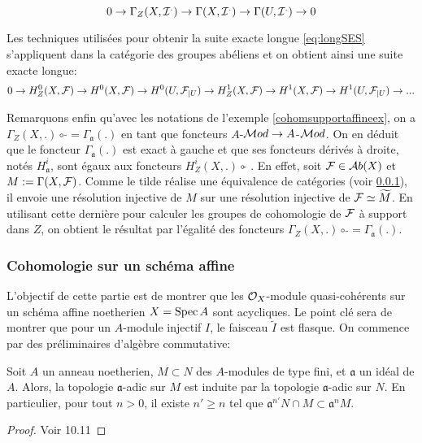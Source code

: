 $$0\rightarrow \Gamma_Z(X,\mathcal{I}^.)\rightarrow \Gamma(X,\mathcal{I}^.)\rightarrow \Gamma(U,\mathcal{I}^.)\rightarrow 0$$

Les techniques utilisées pour obtenir la suite exacte longue \ref{eq:longSES} s'appliquent dans la catégorie des groupes abéliens et on obtient ainsi une suite exacte longue:
\begin{equation}\label{eq:longSESSupport}
0\rightarrow H_Z^0(X,\mathcal{F})\rightarrow H^0(X,\mathcal{F})\rightarrow H^0(U,\mathcal{F}_{|U})\rightarrow  H_Z^1(X,\mathcal{F})\rightarrow H^1(X,\mathcal{F})\rightarrow H^1(U,\mathcal{F}_{|U})\rightarrow ...
\end{equation}


Remarquons enfin qu'avec les notations de l'exemple \ref{cohomsupportaffineex}, on a $\Gamma_Z(X, .)\circ\, \widetilde{}=\Gamma_\mathfrak{a}(.)$ en tant que foncteurs $A$-$\mathcal{M} od\rightarrow A$-$\mathcal{M} od$. On en déduit que le foncteur $\Gamma_\mathfrak{a}(.)$ est exact à gauche et que ses foncteurs dérivés à droite, notés $H_\mathfrak{a}^i$, sont égaux aux foncteurs $H_Z^i(X,.)\circ \widetilde{}$ . En effet, soit $\mathcal{F} \in \mathcal{A} b(X)$ et $M:=\Gamma(X,\mathcal{F})$. Comme le tilde réalise une équivalence de catégories (voir \ref{}), il envoie une résolution injective de $M$ sur une résolution injective de $\mathcal{F}\simeq \widetilde{M}$. En utilisant cette dernière pour calculer les groupes de cohomologie de $\mathcal{F}$ à support dans $Z$, on obtient le résultat par l'égalité des foncteurs $\Gamma_Z(X, .)\circ\, \widetilde{}=\Gamma_\mathfrak{a}(.)$.

\subsubsection{Cohomologie sur un schéma affine}

L'objectif de cette partie est de montrer que les $\mathcal{O}_X$-module quasi-cohérents sur un schéma affine noetherien $X=\operatorname{Spec} A$ sont acycliques. Le point clé sera de montrer que pour un $A$-module injectif $I$, le faisceau $\widetilde{I}$ est flasque. On commence par des préliminaires d'algèbre commutative:

\begin{thm}[de Krull]
Soit $A$ un anneau noetherien, $M\subset N$ des $A$-modules de type fini, et $\mathfrak{a}$ un idéal de $A$. Alors, la topologie $\mathfrak{a}$-adic sur $M$ est induite par la topologie $\mathfrak{a}$-adic sur $N$. En particulier, pour tout $n>0$, il existe $n'\geq n$ tel que $\mathfrak{a}^{n'}N\cap M\subset\mathfrak{a}^nM$.
\end{thm}
\begin{proof}
Voir \cite{atiyahmacdo} 10.11
\end{proof}


